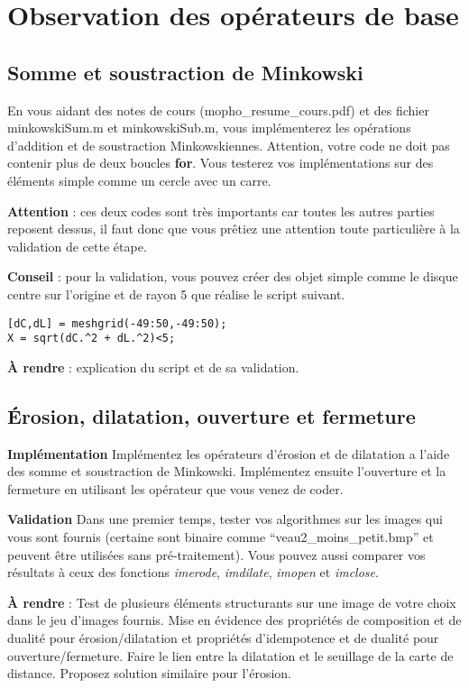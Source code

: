 \documentclass[10pt,a4paper]{article}
\begin{document}
\clearpage
\section{Observation des op\'{e}rateurs de base}
\subsection{Somme et soustraction de Minkowski}
En vous aidant des notes de cours (mopho\_resume\_cours.pdf) et des fichier minkowskiSum.m et minkowskiSub.m, vous impl\'{e}menterez les op\'{e}rations d'addition et de soustraction Minkowskiennes. Attention, votre code ne doit pas contenir plus de deux boucles \textbf{for}. Vous testerez vos impl\'{e}mentations sur des \'{e}l\'{e}ments simple comme un cercle avec un carre. 

\noindent\textbf{Attention} : ces deux codes sont tr\`{e}s importants car toutes les autres parties reposent dessus, il faut donc que vous pr\^{e}tiez une attention toute particuli\`{e}re \`{a} la validation de cette \'{e}tape. 

\noindent\textbf{Conseil} : pour la validation, vous pouvez cr\'{e}er des objet simple comme le disque centre sur l'origine et de rayon 5 que r\'{e}alise le script suivant.
\begin{verbatim}
[dC,dL] = meshgrid(-49:50,-49:50);
X = sqrt(dC.^2 + dL.^2)<5;
\end{verbatim}

\noindent\textbf{\`{A} rendre} : explication du script et de sa validation.


\subsection{\'{E}rosion, dilatation, ouverture et fermeture}
\textbf{Impl\'{e}mentation} Impl\'{e}mentez les op\'{e}rateurs d'\'{e}rosion et de dilatation a l'aide des somme et soustraction de Minkowski. Impl\'{e}mentez ensuite l'ouverture et la fermeture en utilisant les op\'{e}rateur que vous venez de coder.

\noindent\textbf{Validation} Dans une premier temps, tester vos algorithmes sur les images qui vous sont fournis (certaine sont binaire comme ``veau2\_moins\_petit.bmp'' et peuvent \^{e}tre utilis\'{e}es sans pr\'{e}-traitement). Vous pouvez aussi comparer vos r\'{e}sultats \`{a} ceux des fonctions \textit{imerode}, \textit{imdilate}, \textit{imopen} et \textit{imclose}.

\noindent\textbf{\`{A} rendre} : Test de plusieurs \'{e}l\'{e}ments structurants sur une image de votre choix dans le jeu d'images fournis. Mise en \'{e}vidence des propri\'{e}t\'{e}s de composition et de dualit\'{e} pour \'{e}rosion/dilatation et propri\'{e}t\'{e}s d'idempotence et de dualit\'{e} pour  ouverture/fermeture. Faire le lien entre la dilatation et le seuillage de la carte de distance. Proposez solution similaire pour l'\'{e}rosion.
\end{document}

